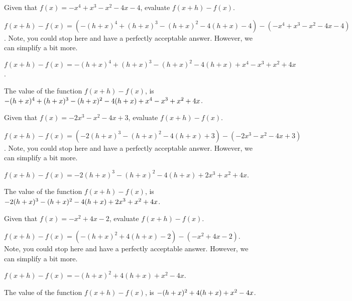 \begin{shuffle}
\begin{exercise}
Given that $f(x)=-x^4+x^3-x^2-4 x-4$, evaluate $f(x+h)-f(x)$.
\begin{solution}
\begin{hint}
$f(x+h)-f(x)=(-(h+x)^4+(h+x)^3-(h+x)^2-4 (h+x)-4)-(-x^4+x^3-x^2-4 x-4)$. Note, you could stop here and have a perfectly acceptable answer. However, we can simplify a bit more.
\end{hint}
\begin{hint}
$f(x+h)-f(x)=-(h+x)^4+(h+x)^3-(h+x)^2-4 (h+x)+x^4-x^3+x^2+4 x$.
\end{hint}
The value of the function $f(x+h)-f(x)$, is ${-(h+x)^4+(h+x)^3-(h+x)^2-4 (h+x)+x^4-x^3+x^2+4 x}$.
\end{solution}
\end{exercise}

\begin{exercise}
Given that $f(x)=-2 x^3-x^2-4 x+3$, evaluate $f(x+h)-f(x)$.
\begin{solution}
\begin{hint}
$f(x+h)-f(x)=(-2 (h+x)^3-(h+x)^2-4 (h+x)+3)-(-2 x^3-x^2-4 x+3)$. Note, you could stop here and have a perfectly acceptable answer. However, we can simplify a bit more.
\end{hint}
\begin{hint}
$f(x+h)-f(x)=-2 (h+x)^3-(h+x)^2-4 (h+x)+2 x^3+x^2+4 x$.
\end{hint}
The value of the function $f(x+h)-f(x)$, is ${-2 (h+x)^3-(h+x)^2-4 (h+x)+2 x^3+x^2+4 x}$.
\end{solution}
\end{exercise}

\begin{exercise}
Given that $f(x)=-x^2+4 x-2$, evaluate $f(x+h)-f(x)$.
\begin{solution}
\begin{hint}
$f(x+h)-f(x)=(-(h+x)^2+4 (h+x)-2)-(-x^2+4 x-2)$. Note, you could stop here and have a perfectly acceptable answer. However, we can simplify a bit more.
\end{hint}
\begin{hint}
$f(x+h)-f(x)=-(h+x)^2+4 (h+x)+x^2-4 x$.
\end{hint}
The value of the function $f(x+h)-f(x)$, is ${-(h+x)^2+4 (h+x)+x^2-4 x}$.
\end{solution}
\end{exercise}


\end{shuffle}
